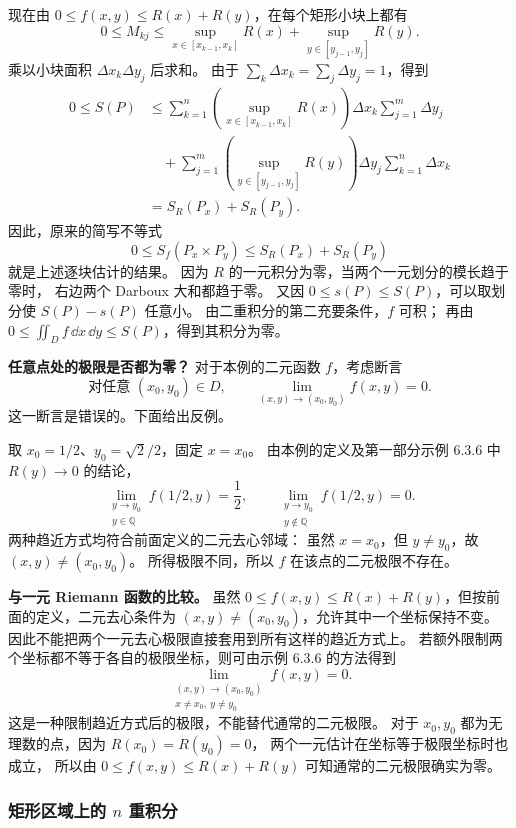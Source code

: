 \begin{example}[二重积分存在而某些切片不可积]
现在由 $0\le f(x,y)\le R(x)+R(y)$，在每个矩形小块上都有
\[
0\le M_{kj}
\le\sup_{x\in[x_{k-1},x_k]}R(x)
+\sup_{y\in[y_{j-1},y_j]}R(y).
\]
乘以小块面积 $\Delta x_k\Delta y_j$ 后求和。
由于 $\sum_k\Delta x_k=\sum_j\Delta y_j=1$，得到
\[
\begin{aligned}
0\le S(P)
&\le
\sum_{k=1}^n
\left(\sup_{x\in[x_{k-1},x_k]}R(x)\right)\Delta x_k
\sum_{j=1}^m\Delta y_j\\
&\quad+
\sum_{j=1}^m
\left(\sup_{y\in[y_{j-1},y_j]}R(y)\right)\Delta y_j
\sum_{k=1}^n\Delta x_k\\
&=S_R(P_x)+S_R(P_y).
\end{aligned}
\]
因此，原来的简写不等式
\[
0\le S_f(P_x\times P_y)\le S_R(P_x)+S_R(P_y)
\]
就是上述逐块估计的结果。
因为 $R$ 的一元积分为零，当两个一元划分的模长趋于零时，
右边两个 Darboux 大和都趋于零。
又因 $0\le s(P)\le S(P)$，可以取划分使
$S(P)-s(P)$ 任意小。
由二重积分的第二充要条件，$f$ 可积；
再由 $\displaystyle 0\le\displaystyle\iint_D f\,\dd x\,\dd y\le S(P)$，得到其积分为零。


\textbf{任意点处的极限是否都为零？}
对于本例的二元函数 $f$，考虑断言
\[
\text{对任意 }(x_0,y_0)\in D,\qquad
\lim_{(x,y)\to(x_0,y_0)}f(x,y)=0.
\]
这一断言是错误的。下面给出反例。

取 $x_0=1/2$、$y_0=\sqrt2/2$，固定 $x=x_0$。
由本例的定义及第一部分示例 6.3.6 中 $R(y)\to0$ 的结论，
\[
\lim_{\substack{y\to y_0\\y\in\mathbb Q}}f(1/2,y)=\frac12,
\qquad
\lim_{\substack{y\to y_0\\y\notin\mathbb Q}}f(1/2,y)=0.
\]
两种趋近方式均符合前面定义的二元去心邻域：
虽然 $x=x_0$，但 $y\ne y_0$，故 $(x,y)\ne(x_0,y_0)$。
所得极限不同，所以 $f$ 在该点的二元极限不存在。

\textbf{与一元 Riemann 函数的比较。}
虽然 $0\le f(x,y)\le R(x)+R(y)$，但按前面的定义，二元去心条件为
$(x,y)\ne(x_0,y_0)$，允许其中一个坐标保持不变。
因此不能把两个一元去心极限直接套用到所有这样的趋近方式上。
若额外限制两个坐标都不等于各自的极限坐标，则可由示例 6.3.6 的方法得到
\[
\lim_{\substack{(x,y)\to(x_0,y_0)\\x\ne x_0,\ y\ne y_0}}f(x,y)=0.
\]
这是一种限制趋近方式后的极限，不能替代通常的二元极限。
对于 $x_0,y_0$ 都为无理数的点，因为 $R(x_0)=R(y_0)=0$，
两个一元估计在坐标等于极限坐标时也成立，
所以由 $0\le f(x,y)\le R(x)+R(y)$ 可知通常的二元极限确实为零。
\end{example}

\subsubsection*{矩形区域上的 $n$ 重积分}

